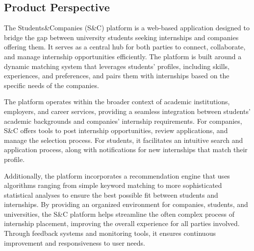 \subsection{Product Perspective}
The Students\&Companies (S\&C) platform is a web-based application designed to bridge the gap between university students seeking internships and companies offering them. It serves as a central hub for both parties to connect, collaborate, and manage internship opportunities efficiently. The platform is built around a dynamic matching system that leverages students' profiles, including skills, experiences, and preferences, and pairs them with internships based on the specific needs of the companies.

The platform operates within the broader context of academic institutions, employers, and career services, providing a seamless integration between students’ academic backgrounds and companies’ internship requirements. For companies, S\&C offers tools to post internship opportunities, review applications, and manage the selection process. For students, it facilitates an intuitive search and application process, along with notifications for new internships that match their profile.

Additionally, the platform incorporates a recommendation engine that uses algorithms ranging from simple keyword matching to more sophisticated statistical analyses to ensure the best possible fit between students and internships. By providing an organized environment for companies, students, and universities, the S\&C platform helps streamline the often complex process of internship placement, improving the overall experience for all parties involved. Through feedback systems and monitoring tools, it ensures continuous improvement and responsiveness to user needs. \newline


